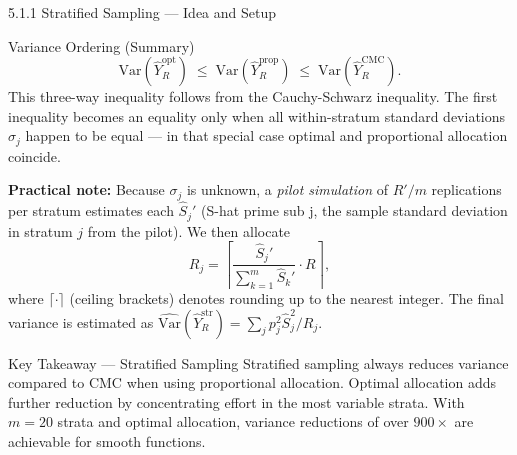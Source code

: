 \documentclass[aspectratio=169,10pt]{beamer}
\begin{document}
\begin{frame}[allowframebreaks]{5.1.1 Stratified Sampling --- Idea and Setup}
\begin{block}{Variance Ordering (Summary)}
  \[
    \mathrm{Var}(\hat{Y}_R^{\mathrm{opt}}) \;\le\;
    \mathrm{Var}(\hat{Y}_R^{\mathrm{prop}}) \;\le\;
    \mathrm{Var}(\hat{Y}_R^{\mathrm{CMC}}).
  \]
  This three-way inequality follows from the Cauchy-Schwarz inequality.
  The first inequality becomes an equality only when all within-stratum
  standard deviations $\sigma_j$ happen to be equal --- in that special case
  optimal and proportional allocation coincide.
\end{block}

\textbf{Practical note:} Because $\sigma_j$ is unknown, a \emph{pilot simulation}
of $R' / m$ replications per stratum estimates each $\hat{S}_j'$ (S-hat prime sub j,
the sample standard deviation in stratum $j$ from the pilot).  We then allocate
\[
  R_j = \left\lceil
    \frac{\hat{S}_j'}{\sum_{k=1}^m \hat{S}_k'} \cdot R
  \right\rceil,
\]
where $\lceil \cdot \rceil$ (ceiling brackets) denotes rounding up to the
nearest integer.  The final variance is estimated as
$\widehat{\mathrm{Var}}(\hat{Y}_R^{\mathrm{str}}) = \sum_j p_j^2 \hat{S}_j^2 / R_j$.

\begin{alertblock}{Key Takeaway --- Stratified Sampling}
  Stratified sampling always reduces variance compared to CMC when using
  proportional allocation.  Optimal allocation adds further reduction by
  concentrating effort in the most variable strata.  With $m = 20$ strata
  and optimal allocation, variance reductions of over $900\times$ are
  achievable for smooth functions.
\end{alertblock}

\end{frame}
\end{document}
